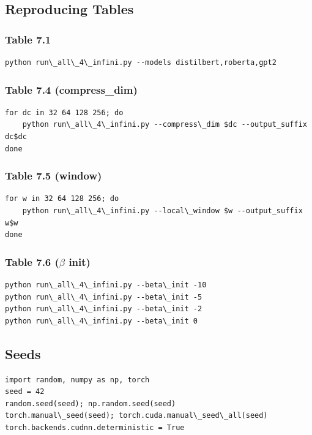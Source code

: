 \subsection{Reproducing Tables}

\subsubsection{Table 7.1}
\begin{lstlisting}
python run\_all\_4\_infini.py --models distilbert,roberta,gpt2
\end{lstlisting}

\subsubsection{Table 7.4 (compress\_dim)}
\begin{lstlisting}
for dc in 32 64 128 256; do
    python run\_all\_4\_infini.py --compress\_dim $dc --output_suffix dc$dc
done
\end{lstlisting}

\subsubsection{Table 7.5 (window)}
\begin{lstlisting}
for w in 32 64 128 256; do
    python run\_all\_4\_infini.py --local\_window $w --output_suffix w$w
done
\end{lstlisting}

\subsubsection{Table 7.6 ($\beta$ init)}
\begin{lstlisting}
python run\_all\_4\_infini.py --beta\_init -10
python run\_all\_4\_infini.py --beta\_init -5
python run\_all\_4\_infini.py --beta\_init -2
python run\_all\_4\_infini.py --beta\_init 0
\end{lstlisting}

\subsection{Seeds}

\begin{lstlisting}
import random, numpy as np, torch
seed = 42
random.seed(seed); np.random.seed(seed)
torch.manual\_seed(seed); torch.cuda.manual\_seed\_all(seed)
torch.backends.cudnn.deterministic = True
\end{lstlisting}

